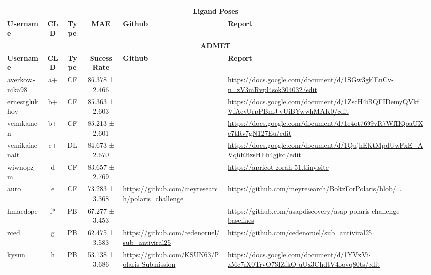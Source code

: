 \documentclass[journal=jcim,manuscript=suppinfo]{achemso}
\begin{document}
\newpage




{\tiny

\begin{longtable}{|p{2cm}|c|c|c|p{4cm}|p{6cm}|}
\hline
\multicolumn{6}{|c|}{\small{\textbf{Ligand Poses}}} \\
\hline
\textbf{Username} & \textbf{CLD} & \textbf{Type} & \textbf{MAE} & \textbf{Github} & \textbf{Report} \\
\hline
\endfirsthead

\hline
\multicolumn{6}{|c|}{\small{\textbf{ADMET}}} \\
\hline
\textbf{Username} & \textbf{CLD} & \textbf{Type} & \textbf{Sucess Rate} & \textbf{Github} & \textbf{Report} \\
\hline
\endhead

\endfoot

averkova-nika98 & a+ & CF & 86.378 ± 2.466 &   & \url{https://docs.google.com/document/d/1SGw3gklEnCv-n_zV3mRvpl4sok304032/edit} \\
\hline
ernestglukhov & b+ & CF & 85.363 ± 2.603 &   & \url{https://docs.google.com/document/d/1ZscH4iBQFIDemyQVkfVfAevUrpPBmJ-vUiBYwwhMAK0/edit} \\
\hline
vemikainen & b+ & CF & 85.213 ± 2.601 &   & \url{https://docs.google.com/document/d/1e4ot7699vR7WfHQoaUXe7tRv7gN127Eu/edit} \\
\hline
vemikainenalt & c+ & DL & 84.673 ± 2.670 &   & \url{https://docs.google.com/document/d/1QujhEKtMpdUwFxE_AVq6RBzsHEh4gjkd/edit} \\
\hline
wiwnopgm & d & CF & 83.657 ± 2.769 &   & \url{https://apricot-zorah-51.tiiny.site} \\
\hline
auro & e & CF & 73.283 ± 3.368 & \url{https://github.com/meyresearch/polaris_challenge} & \url{https://github.com/meyresearch/BoltzForPolaris/blob/...} \\
\hline
hmacdope & f* & PB & 67.277 ± 3.453 &   & \url{https://github.com/asapdiscovery/asap-polaris-challenge-baselines} \\
\hline
rced & g & PB & 62.475 ± 3.583 & \url{https://github.com/cedenoruel/sub_antiviral25} & \url{https://github.com/cedenoruel/sub_antiviral25} \\
\hline
kysun & h & PB & 53.138 ± 3.686 & \url{https://github.com/KSUN63/Polaris-Submission} & \url{https://docs.google.com/document/d/1YVxVi-zMc7rX0TrvO7SIZfkQ-uUx3ChdtV4oovq80ts/edit} \\
\hline


\end{longtable}}
\end{document}
